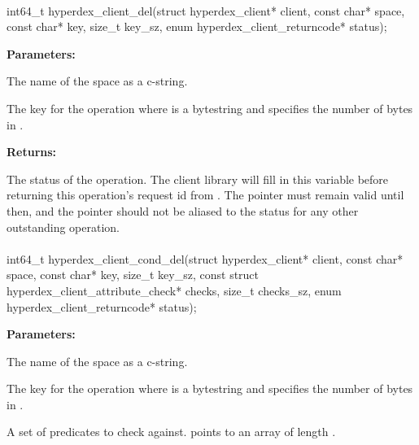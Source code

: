 \paragraph{}
\begin{ccode}
int64_t hyperdex_client_del(struct hyperdex_client* client,
                const char* space,
                const char* key, size_t key_sz,
                enum hyperdex_client_returncode* status);
\end{ccode}
\funcdesc 

\noindent\textbf{Parameters:}
\begin{description}[labelindent=\widthof{{\code{key}, \code{key\_sz}}},leftmargin=*,noitemsep,nolistsep,align=right]
\item[\code{space}] The name of the space as a c-string.
\item[\code{key}, \code{key\_sz}] The key for the operation where  is a bytestring and  specifies the number of bytes in .
\end{description}

\noindent\textbf{Returns:}
\begin{description}[labelindent=\widthof{{\code{status}}},leftmargin=*,noitemsep,nolistsep,align=right]
\item[\code{status}] The status of the operation.  The client library will fill in this variable before returning this operation's request id from .  The pointer must remain valid until then, and the pointer should not be aliased to the status for any other outstanding operation.
\end{description}

\paragraph{}
\begin{ccode}
int64_t hyperdex_client_cond_del(struct hyperdex_client* client,
                const char* space,
                const char* key, size_t key_sz,
                const struct hyperdex_client_attribute_check* checks, size_t checks_sz,
                enum hyperdex_client_returncode* status);
\end{ccode}
\funcdesc 

\noindent\textbf{Parameters:}
\begin{description}[labelindent=\widthof{{\code{checks}, \code{checks\_sz}}},leftmargin=*,noitemsep,nolistsep,align=right]
\item[\code{space}] The name of the space as a c-string.
\item[\code{key}, \code{key\_sz}] The key for the operation where  is a bytestring and  specifies the number of bytes in .
\item[\code{checks}, \code{checks\_sz}] A set of predicates to check against.   points to an array of length .
\end{description}

